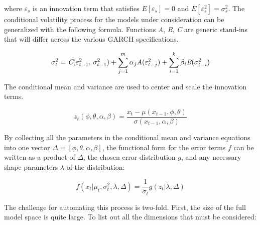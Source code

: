 \documentclass[12pt]{report}
\begin{document}
where $\varepsilon_{s}$ is an innovation term that satisfies $E[\varepsilon_{s}] = 0$ and $E[\varepsilon^{2}_{s}] = \sigma^{2}_{s}$. The conditional volatility process for the models under consideration can be generalized with the following formula. Functions \emph{A}, \emph{B}, \emph{C} are generic stand-ins that will differ across the various GARCH specifications.

\begin{equation} \label{eq:conditional_var}
    \sigma^{2}_{t} = \emph{C}(\varepsilon^{2}_{t-1}, \, \sigma^{2}_{t-1}) + \sum_{j=1}^{m} \alpha_{j} \emph{A}(\varepsilon^{2}_{t - j}) + \sum_{i=1}^{k} \beta_{i} \emph{B}(\sigma^{2}_{t - i})
\end{equation}

The conditional mean and variance are used to center and scale the innovation terms.

\begin{equation} \label{eq:z_score_returns}
    z_{t}(\phi, \theta, \alpha, \beta) = \frac{x_{t} - \mu(x_{t-1}, \phi, \theta)}{\sigma(x_{t-1}, \alpha, \beta)}
\end{equation}

By collecting all the parameters in the conditional mean and variance equations into one vector $\Delta = [\phi, \theta, \alpha, \beta]$, the functional form for the error terms $f$ can be written as a product of $\Delta$, the chosen error distribution $g$, and any necessary shape parameters $\lambda$ of the distribution:

\begin{equation} \label{eq:conditional_distr}
    f(x_{t} | \mu_{t}, \sigma^{2}_{t}, \lambda, \Delta) = \frac{1}{\sigma_{t}} g(z_{t} | \lambda, \Delta)
\end{equation}

The challenge for automating this process is two-fold. First, the size of the full model space is quite large. To list out all the dimensions that must be considered:
\end{document}

